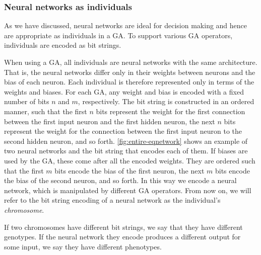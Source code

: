 \subsubsection{Neural networks as individuals}

As we have discussed, neural networks are ideal for decision making and hence are appropriate as individuals in a GA. To support various GA operators, individuals are encoded as bit strings.


When using a GA, all individuals are neural networks with the same architecture.
That is, the neural networks differ only in their weights between neurons and the bias of each neuron.
Each individual is therefore represented only in terms of the weights and biases.
For each GA, any weight and bias is encoded with a fixed number of bits $n$ and $m$, respectively.
The bit string is constructed in an ordered manner, such that the first $n$ bits represent the weight for the first connection between the first input neuron and the first hidden neuron, the next $n$ bits represent the weight for the connection between the first input neuron to the second hidden neuron, and so forth. \cref{fig:entire-eqnetwork} shows an example of two neural networks and the bit string that encodes each of them.
If biases are used by the GA, these come after all the encoded weights.
They are ordered such that the first $m$ bits encode the bias of the first neuron, the next $m$ bits encode the bias of the second neuron, and so forth.
In this way we encode a neural network, which is manipulated by different GA operators.
From now on, we will refer to the bit string encoding of a neural network as the individual's \emph{chromosome}.




%
If two chromosomes have different bit strings, we say that they have different genotypes. If the neural network they encode produces a different output for some input, we say they have different phenotypes.
